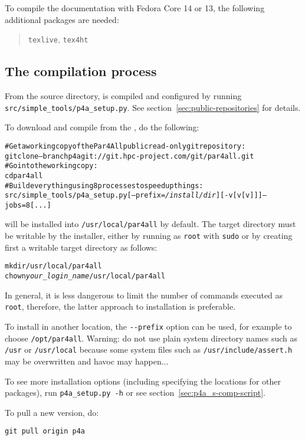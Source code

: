 \documentclass[a4paper]{article}
\begin{document}
To compile the documentation with Fedora Core 14 or 13, the following
additional packages are needed:
\begin{quote}
  \texttt{texlive}, \texttt{tex4ht}
\end{quote}

\subsection{The compilation process}
\label{sec:compilation-process}

From the \Apfa source directory, \Apfa is compiled and configured
by running \verb|src/simple_tools/p4a_setup.py|. See
section~\ref{sec:public-repositories} for details.

To download and compile \Apfa from the \Agit, do the following:
\begin{alltt}
# Get a working copy of the Par4All public read-only git repository:
git clone --branch p4a git://git.hpc-project.com/git/par4all.git
# Go into the working copy:
cd par4all
# Build everything using 8 processes to speed up things:
src/simple_tools/p4a_setup.py [--prefix=\emph{/install/dir}] [-v[v[v]]] --jobs=8 [...]
\end{alltt}%
\Apfa will be installed into \verb|/usr/local/par4all| by default.
The target directory must be writable by the installer, either by running
as \texttt{root} with \texttt{sudo} or by creating first a
writable target directory as follows:
\begin{alltt}
mkdir /usr/local/par4all
chown \emph{your_login_name} /usr/local/par4all
\end{alltt}
In general, it is less dangerous to limit the number of commands
executed as \texttt{root}, therefore, the latter approach to \Apfa
installation is preferable.

To install in another location, the \verb|--prefix| option can be used,
for example to choose \texttt{/opt/par4all}. Warning: do not use plain
system directory names such as \texttt{/usr} or \texttt{/usr/local}
because some system files such as \texttt{/usr/include/assert.h} may be
overwritten and havoc may happen...

To see more installation options (including specifying the locations for
other packages), run \verb|p4a_setup.py -h| or see
section~\ref{sec:p4a_s-comp-script}.

To pull a new version, do:
\begin{verbatim}
git pull origin p4a
\end{verbatim}
\end{document}
